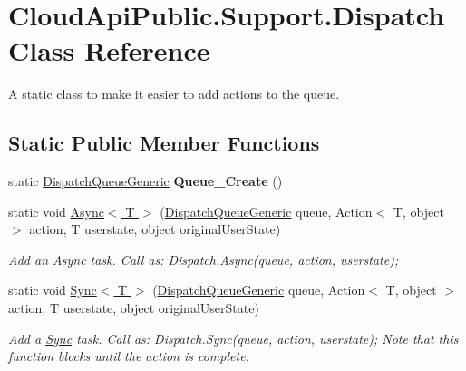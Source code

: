 \hypertarget{class_cloud_api_public_1_1_support_1_1_dispatch}{\section{Cloud\-Api\-Public.\-Support.\-Dispatch Class Reference}
\label{class_cloud_api_public_1_1_support_1_1_dispatch}
}


A static class to make it easier to add actions to the queue.  


\subsection*{Static Public Member Functions}
\begin{DoxyCompactItemize}
\item 
\hypertarget{class_cloud_api_public_1_1_support_1_1_dispatch_aab0d46d08a8ce66c8da90d8cdfe60052}{static \hyperlink{class_cloud_api_public_1_1_support_1_1_dispatch_queue_generic}{Dispatch\-Queue\-Generic} {\bfseries Queue\-\_\-\-Create} ()}\label{class_cloud_api_public_1_1_support_1_1_dispatch_aab0d46d08a8ce66c8da90d8cdfe60052}

\item 
static void \hyperlink{class_cloud_api_public_1_1_support_1_1_dispatch_ac28db5d1b13f90569993680ced236807}{Async$<$ T $>$} (\hyperlink{class_cloud_api_public_1_1_support_1_1_dispatch_queue_generic}{Dispatch\-Queue\-Generic} queue, Action$<$ T, object $>$ action, T userstate, object original\-User\-State)
\begin{DoxyCompactList}\small\item\em Add an Async task. Call as\-: Dispatch.\-Async(queue, action, userstate); \end{DoxyCompactList}\item 
static void \hyperlink{class_cloud_api_public_1_1_support_1_1_dispatch_aa9336811b9d268159e29ff6904b1415b}{Sync$<$ T $>$} (\hyperlink{class_cloud_api_public_1_1_support_1_1_dispatch_queue_generic}{Dispatch\-Queue\-Generic} queue, Action$<$ T, object $>$ action, T userstate, object original\-User\-State)
\begin{DoxyCompactList}\small\item\em Add a \hyperlink{namespace_cloud_api_public_1_1_sync}{Sync} task. Call as\-: Dispatch.\-Sync(queue, action, userstate); Note that this function blocks until the action is complete. \end{DoxyCompactList}\end{DoxyCompactItemize}


